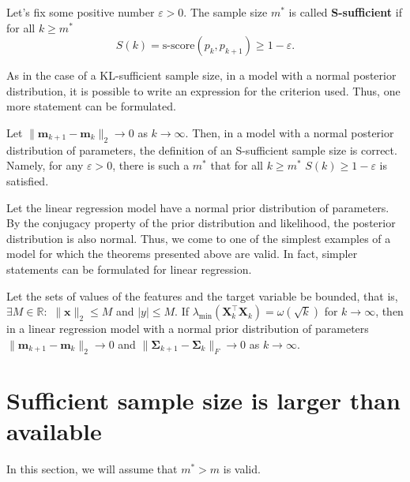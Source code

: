 \documentclass[
11pt,%
tightenlines,%
twoside,%
onecolumn,%
nofloats,%
nobibnotes,%
nofootinbib,%
superscriptaddress,%
noshowpacs,%
centertags]%
{revtex4-2}
\begin{document}
\begin{definition}
    Let's fix some positive number $\varepsilon > 0$. The sample size $m^*$ is called \textbf{S-sufficient} if for all $k\geqslant m^*$
    \[ S(k) = \text{s-score}(p_k, p_{k+1}) \geqslant 1-\varepsilon. \]
\end{definition}

As in the case of a KL-sufficient sample size, in a model with a normal posterior distribution, it is possible to write an expression for the criterion used. Thus, one more statement can be formulated.

\begin{theorem}[Kiselev, 2024]\label{theorem3}
    Let $\|\mathbf{m}_{k+1} - \mathbf{m}_k\|_2\to 0$ as $k \to \infty$. Then, in a model with a normal posterior distribution of parameters, the definition of an S-sufficient sample size is correct. Namely, for any $\varepsilon > 0$, there is such a $m^*$ that for all $k\geqslant m^*$ $S(k)\geqslant 1-\varepsilon$ is satisfied.
\end{theorem}

Let the linear regression model have a normal prior distribution of parameters. By the conjugacy property of the prior distribution and likelihood, the posterior distribution is also normal. Thus, we come to one of the simplest examples of a model for which the theorems presented above are valid. In fact, simpler statements can be formulated for linear regression.

\begin{theorem}[Kiselyov, 2024]\label{theorem4}
    Let the sets of values of the features and the target variable be bounded, that is, $\exists M\in \mathbb{R}:$ $\|\mathbf{x}\|_2\leqslant M$ and $|y|\leqslant M$. If $\lambda_{\min}\left(\mathbf{X}^{\top}_k \mathbf{X}_k \right) = \omega(\sqrt{k})$ for $k\to \infty$, then in a linear regression model with a normal prior distribution of parameters $\|\mathbf{m}_{k+1} - \mathbf{m}_k\|_2\to 0$ and $\|\mathbf{\Sigma}_{k+1} - \mathbf{\Sigma}_k\|_{F}\to 0$ as $k\to \infty$.
\end{theorem}

\section{Sufficient sample size is larger than available}\label{sec3}

In this section, we will assume that $m^*> m$ is valid.
\end{document}
